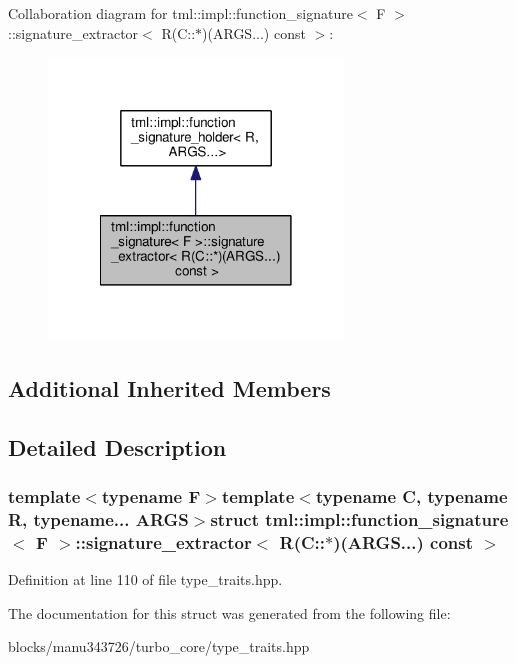 Collaboration diagram for tml\+:\+:impl\+:\+:function\+\_\+signature$<$ F $>$\+:\+:signature\+\_\+extractor$<$ R(C\+:\+:$\ast$)(A\+R\+G\+S...) const $>$\+:
\nopagebreak
\begin{figure}[H]
\begin{center}
\leavevmode
\includegraphics[width=222pt]{structtml_1_1impl_1_1function__signature_1_1signature__extractor_3_01_r_07_c_1_1_5_08_07_a_r_g_s5ccb4afd79edd28320b6a4d929dc5e3d}
\end{center}
\end{figure}
\subsection*{Additional Inherited Members}


\subsection{Detailed Description}
\subsubsection*{template$<$typename F$>$template$<$typename C, typename R, typename... A\+R\+G\+S$>$struct tml\+::impl\+::function\+\_\+signature$<$ F $>$\+::signature\+\_\+extractor$<$ R(\+C\+::$\ast$)(\+A\+R\+G\+S...) const  $>$}



Definition at line 110 of file type\+\_\+traits.\+hpp.



The documentation for this struct was generated from the following file\+:\begin{DoxyCompactItemize}
\item 
blocks/manu343726/turbo\+\_\+core/type\+\_\+traits.\+hpp\end{DoxyCompactItemize}
